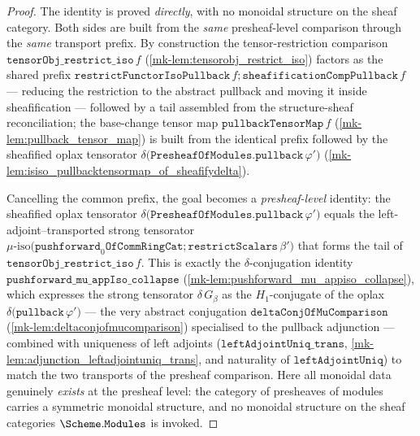 \begin{proof}
  \leanok
  The identity is proved \emph{directly}, with no monoidal structure on the sheaf category. Both
  sides are built from the \emph{same} presheaf-level comparison through the \emph{same} transport
  prefix. By construction the tensor-restriction comparison
  \(\mathtt{tensorObj\_restrict\_iso}\,f\) (\ref{mk-lem:tensorobj_restrict_iso}) factors as the shared
  prefix \(\mathtt{restrictFunctorIsoPullback}\,f \mathbin{;} \mathtt{sheafificationCompPullback}\,f\)
  --- reducing the restriction to the abstract pullback and moving it inside sheafification ---
  followed by a tail assembled from the structure-sheaf reconciliation; the base-change tensor map
  \(\mathtt{pullbackTensorMap}\,f\) (\ref{mk-lem:pullback_tensor_map}) is built from the identical
  prefix followed by the sheafified oplax tensorator
  \(\delta\bigl(\mathtt{PresheafOfModules.pullback}\,\varphi'\bigr)\)
  (\ref{mk-lem:isiso_pullbacktensormap_of_sheafifydelta}).

  Cancelling the common prefix, the goal becomes a \emph{presheaf-level} identity: the sheafified
  oplax tensorator \(\delta\bigl(\mathtt{PresheafOfModules.pullback}\,\varphi'\bigr)\) equals the
  left-adjoint--transported strong tensorator
  \(\mu\text{-iso}\bigl(\mathtt{pushforward}_0\mathtt{OfCommRingCat} \mathbin{;} \mathtt{restrictScalars}\,
  \beta'\bigr)\) that forms the tail of \(\mathtt{tensorObj\_restrict\_iso}\,f\). This is exactly the
  \(\delta\)-conjugation identity \(\mathtt{pushforward\_mu\_appIso\_collapse}\)
  (\ref{mk-lem:pushforward_mu_appiso_collapse}), which expresses the strong tensorator
  \(\delta\,G_\beta\) as the \(H_1\)-conjugate of the oplax
  \(\delta\bigl(\mathtt{pullback}\,\varphi'\bigr)\) --- the very abstract conjugation
  \(\mathtt{deltaConjOfMuComparison}\) (\ref{mk-lem:deltaconjofmucomparison}) specialised to the
  pullback adjunction --- combined with uniqueness of left adjoints
  (\(\mathtt{leftAdjointUniq\_trans}\), \ref{mk-lem:adjunction_leftadjointuniq_trans}, and naturality of
  \(\mathtt{leftAdjointUniq}\)) to match the two transports of the presheaf comparison. Here all
  monoidal data genuinely \emph{exists} at the presheaf level: the category of presheaves of
  modules carries a symmetric monoidal structure, and no monoidal structure on the sheaf
  categories \(\Scheme.\mathtt{Modules}\) is invoked.


\end{proof}
